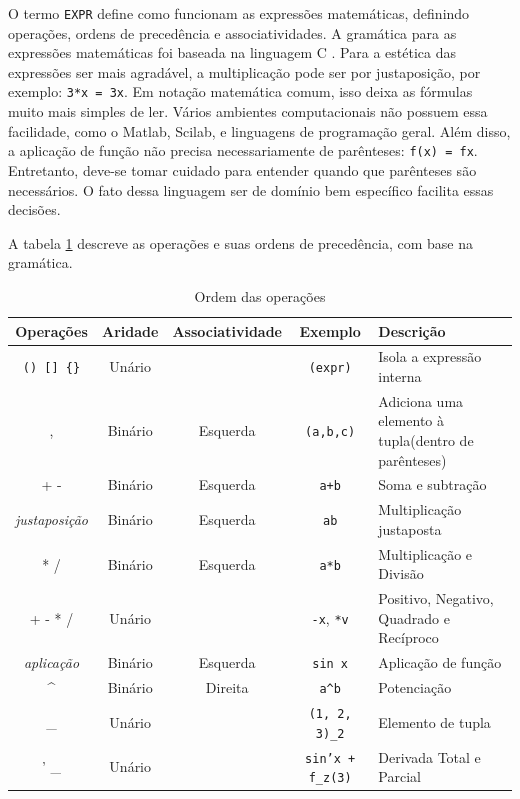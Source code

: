 O termo \texttt{EXPR} define como funcionam as expressões matemáticas,
definindo operações, ordens de precedência e associatividades.
A gramática para as expressões matemáticas foi baseada na linguagem C \cite{CGram}.
Para a estética das expressões ser mais agradável, a multiplicação pode ser
por justaposição, por exemplo: \texttt{3*x = 3x}.
Em notação matemática comum, isso deixa as fórmulas muito mais simples de ler.
Vários ambientes computacionais não possuem essa facilidade,
como o Matlab, Scilab, e linguagens de programação geral.
Além disso, a aplicação de função não precisa
necessariamente de parênteses: \texttt{f(x) = fx}.
Entretanto, deve-se tomar cuidado para entender
quando que parênteses são necessários.
O fato dessa linguagem ser de domínio bem específico facilita essas decisões.

A tabela \ref{order} descreve as operações e suas ordens de precedência,
com base na gramática.

\begin{table}[ht]
\caption{Ordem das operações}
\label{order}
\begin{centering}
\begin{tabularx}{\textwidth}{||c|c|c|c|X||}
    \cline{1-5}
    Operações & Aridade & Associatividade & Exemplo & Descrição \\ \hline \hline

    \texttt{() [] \{\}} & Unário &  & \texttt{(expr)} & Isola a expressão interna \\ \hline

    , & Binário & Esquerda & \texttt{(a,b,c)} & Adiciona uma elemento à tupla(dentro de parênteses) \\ \hline

    + - & Binário & Esquerda & \texttt{a+b} & Soma e subtração \\ \hline

    \textit{justaposição} & Binário & Esquerda & \texttt{ab} & Multiplicação justaposta \\ \hline

    * / & Binário & Esquerda & \texttt{a*b} & Multiplicação e Divisão \\ \hline

    + - * / & Unário &  & \texttt{-x}, \texttt{*v} & Positivo, Negativo, Quadrado e Recíproco \\ \hline

    \textit{aplicação} & Binário & Esquerda & \texttt{sin x} & Aplicação de função \\ \hline

    \textasciicircum & Binário & Direita & \texttt{a\textasciicircum b} & Potenciação \\ \hline

    \_ & Unário & & \texttt{(1, 2, 3)\_2} & Elemento de tupla \\ \hline
    
    ' \_ & Unário & & \texttt{sin'x + f\_z(3)} & Derivada Total e Parcial \\ \hline
    \cline{1-5}
\end{tabularx}
\end{centering}
\end{table}

